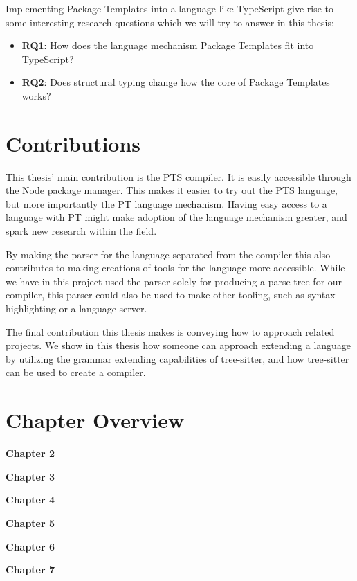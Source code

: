 Implementing Package Templates into a language like TypeScript give rise to some interesting research questions which we will try to answer in this thesis:

\begin{itemize}
    \item \textbf{RQ1}: How does the language mechanism Package Templates fit into TypeScript?
    \item \textbf{RQ2}: Does structural typing change how the core of Package Templates works?
\end{itemize}

\section{Contributions}\label{sec:contributions}

This thesis' main contribution is the PTS compiler.
It is easily accessible through the Node package manager.
This makes it easier to try out the PTS language, but more importantly the PT language mechanism.
Having easy access to a language with PT might make adoption of the language mechanism greater, and spark new research within the field.

By making the parser for the language separated from the compiler this also contributes to making creations of tools for the language more accessible.
While we have in this project used the parser solely for producing a parse tree for our compiler, this parser could also be used to make other tooling, such as syntax highlighting or a language server.

The final contribution this thesis makes is conveying how to approach related projects.
We show in this thesis how someone can approach extending a language by utilizing the grammar extending capabilities of tree-sitter, and how tree-sitter can be used to create a compiler.

\section{Chapter Overview}\label{sec:chapter-overview}


\textbf{Chapter 2}

\textbf{Chapter 3}

\textbf{Chapter 4}

\textbf{Chapter 5}

\textbf{Chapter 6}

\textbf{Chapter 7}

